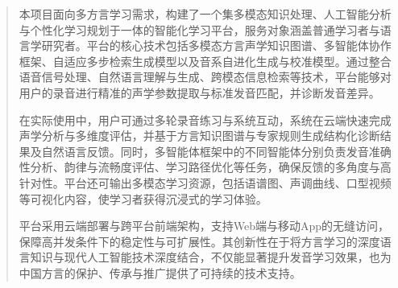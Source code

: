 

\begin{abstract}
本项目面向多方言学习需求，构建了一个集多模态知识处理、人工智能分析与个性化学习规划于一体的智能化学习平台，服务对象涵盖普通学习者与语言学研究者。平台的核心技术包括多模态方言声学知识图谱、多智能体协作框架、自适应多步检索生成模型以及音系自进化生成与校准模型。通过整合语音信号处理、自然语言理解与生成、跨模态信息检索等技术，平台能够对用户的录音进行精准的声学参数提取与标准发音匹配，并诊断发音差异。

在实际使用中，用户可通过多轮录音练习与系统互动，系统在云端快速完成声学分析与多维度评估，并基于方言知识图谱与专家规则生成结构化诊断结果及自然语言反馈。同时，多智能体框架中的不同智能体分别负责发音准确性分析、韵律与流畅度评估、学习路径优化等任务，确保反馈的多角度与高针对性。平台还可输出多模态学习资源，包括语谱图、声调曲线、口型视频等可视化内容，使学习者获得沉浸式的学习体验。

平台采用云端部署与跨平台前端架构，支持Web端与移动App的无缝访问，保障高并发条件下的稳定性与可扩展性。其创新性在于将方言学习的深度语言知识与现代人工智能技术深度结合，不仅能显著提升发音学习效果，也为中国方言的保护、传承与推广提供了可持续的技术支持。
\end{abstract}

